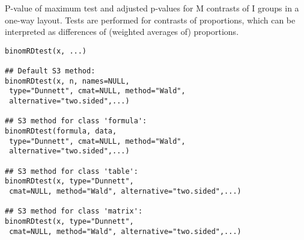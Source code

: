 \begin{Description}\relax
P-value of maximum test and adjusted p-values for M contrasts of I groups
in a one-way layout. Tests are performed for contrasts of proportions,
which can be interpreted as differences of (weighted averages of) proportions.
\end{Description}
\begin{Usage}
\begin{verbatim}
binomRDtest(x, ...)

## Default S3 method:
binomRDtest(x, n, names=NULL,
 type="Dunnett", cmat=NULL, method="Wald",
 alternative="two.sided",...)

## S3 method for class 'formula':
binomRDtest(formula, data,
 type="Dunnett", cmat=NULL, method="Wald",
 alternative="two.sided",...)

## S3 method for class 'table':
binomRDtest(x, type="Dunnett",
 cmat=NULL, method="Wald", alternative="two.sided",...)

## S3 method for class 'matrix':
binomRDtest(x, type="Dunnett",
 cmat=NULL, method="Wald", alternative="two.sided",...)
\end{verbatim}
\end{Usage}
